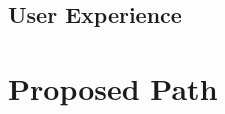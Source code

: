 \documentclass[twocolumn,10pt]{paper}
\begin{document}
\begin{sloppypar}
  
  \subsection{User Experience}

  \section{Proposed Path}

  
\end{sloppypar}
\end{document}
